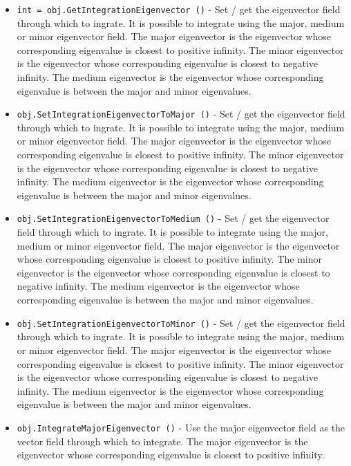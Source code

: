 \begin{itemize}
\item  \verb|int = obj.GetIntegrationEigenvector ()| -  Set / get the eigenvector field through which to ingrate. It is
 possible to integrate using the major, medium or minor
 eigenvector field.  The major eigenvector is the eigenvector
 whose corresponding eigenvalue is closest to positive infinity.
 The minor eigenvector is the eigenvector whose corresponding
 eigenvalue is closest to negative infinity.  The medium
 eigenvector is the eigenvector whose corresponding eigenvalue is
 between the major and minor eigenvalues.

\item  \verb|obj.SetIntegrationEigenvectorToMajor ()| -  Set / get the eigenvector field through which to ingrate. It is
 possible to integrate using the major, medium or minor
 eigenvector field.  The major eigenvector is the eigenvector
 whose corresponding eigenvalue is closest to positive infinity.
 The minor eigenvector is the eigenvector whose corresponding
 eigenvalue is closest to negative infinity.  The medium
 eigenvector is the eigenvector whose corresponding eigenvalue is
 between the major and minor eigenvalues.

\item  \verb|obj.SetIntegrationEigenvectorToMedium ()| -  Set / get the eigenvector field through which to ingrate. It is
 possible to integrate using the major, medium or minor
 eigenvector field.  The major eigenvector is the eigenvector
 whose corresponding eigenvalue is closest to positive infinity.
 The minor eigenvector is the eigenvector whose corresponding
 eigenvalue is closest to negative infinity.  The medium
 eigenvector is the eigenvector whose corresponding eigenvalue is
 between the major and minor eigenvalues.

\item  \verb|obj.SetIntegrationEigenvectorToMinor ()| -  Set / get the eigenvector field through which to ingrate. It is
 possible to integrate using the major, medium or minor
 eigenvector field.  The major eigenvector is the eigenvector
 whose corresponding eigenvalue is closest to positive infinity.
 The minor eigenvector is the eigenvector whose corresponding
 eigenvalue is closest to negative infinity.  The medium
 eigenvector is the eigenvector whose corresponding eigenvalue is
 between the major and minor eigenvalues.

\item  \verb|obj.IntegrateMajorEigenvector ()| -  Use the major eigenvector field as the vector field through which
 to integrate.  The major eigenvector is the eigenvector whose
 corresponding eigenvalue is closest to positive infinity.  


\end{itemize}
